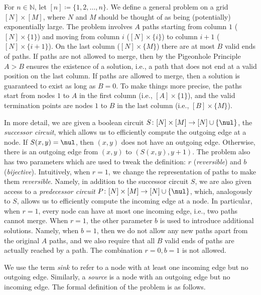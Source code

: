 For $n \in \mathbb{N}$, let $[n] \coloneqq \{1,2,\dots,n\}$. We define a general problem on a grid $[N] \times [M]$, where $N$ and $M$ should be thought of as being (potentially) exponentially large. The problem involves $A$ paths starting from column $1$ ($[N] \times \{1\}$) and moving from column $i$ ($[N] \times \{i\}$) to column $i+1$ ($[N] \times \{i+1\}$). On the last column ($[N] \times \{M\}$) there are at most $B$ valid ends of paths. If paths are not allowed to merge, then by the Pigeonhole Principle $A > B$ ensures the existence of a solution, i.e., a path that does not end at a valid position on the last column. If paths are allowed to merge, then a solution is guaranteed to exist as long as $B = 0$. To make things more precise, the paths start from nodes $1$ to $A$ in the first column (i.e., $[A] \times \{1\}$), and the valid termination points are nodes $1$ to $B$ in the last column (i.e., $[B] \times \{M\}$).

In more detail, we are given a boolean circuit $S\colon [N] \times [M] \to [N] \cup \{\nul\}$, the \emph{successor circuit}, which allows us to efficiently compute the outgoing edge at a node. If $S(x,y) = \nul$, then $(x,y)$ does not have an outgoing edge. Otherwise, there is an outgoing edge from $(x,y)$ to $(S(x,y),y+1)$. The problem also has two parameters which are used to tweak the definition: $r$ (\emph{reversible}) and $b$ (\emph{bijective}). Intuitively, when $r=1$, we change the representation of paths to make them \emph{reversible}. Namely, in addition to the successor circuit $S$, we are also given access to a \emph{predecessor circuit} $P \colon [N] \times [M] \to [N] \cup \{\nul\}$, which, analogously to $S$, allows us to efficiently compute the incoming edge at a node. In particular, when $r=1$, every node can have at most one incoming edge, i.e., two paths cannot merge. When $r=1$, the other parameter $b$ is used to introduce additional solutions. Namely, when $b=1$, then we do not allow any new paths apart from the original $A$ paths, and we also require that all $B$ valid ends of paths are actually reached by a path. The combination $r=0, b=1$ is not allowed.

We use the term \emph{sink} to refer to a node with at least one incoming edge but no outgoing edge. Similarly, a \emph{source} is a node with an outgoing edge but no incoming edge. The formal definition of the problem is as follows.


